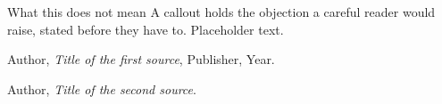 
\begin{hscallout}{What this does not mean}
A callout holds the objection a careful reader would raise, stated before they
have to. Placeholder text.
\end{hscallout}

\hssourcespage
\begin{hssources}
\item Author, \emph{Title of the first source}, Publisher, Year.
\item Author, \emph{Title of the second source}. 
\end{hssources}

